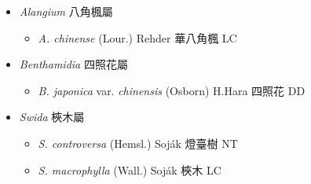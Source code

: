 
  \begin{itemize}
 \item[] \textit{Alangium} 八角楓屬
                                
  \begin{itemize}
        \item[] \textit{A. chinense} (Lour.) Rehder  華八角楓   LC
  \end{itemize}
 \item[] \textit{Benthamidia} 四照花屬
                                
  \begin{itemize}
        \item[] \textit{B. japonica} var. \textit{chinensis} (Osborn) H.Hara  四照花   DD
  \end{itemize}
 \item[] \textit{Swida} 梜木屬
                                
  \begin{itemize}
        \item[] \textit{S. controversa} (Hemsl.) Soják  燈臺樹   NT
        \item[] \textit{S. macrophylla} (Wall.) Soják  梜木   LC
  \end{itemize}
  \end{itemize}
